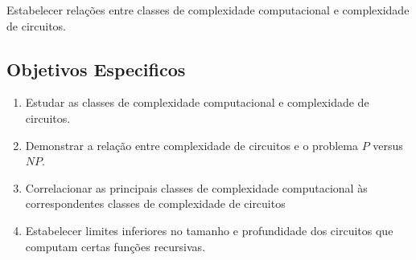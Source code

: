 Estabelecer relações entre classes de complexidade computacional
e complexidade de circuitos.

\subsection{Objetivos Especificos}

\begin{enumerate}
    \item Estudar as classes de complexidade computacional
        e complexidade de circuitos.
    \item Demonstrar a relação entre complexidade de circuitos
        e o problema $P$ versus $NP$.
    \item Correlacionar as principais classes
        de complexidade computacional
        às correspondentes classes de complexidade de circuitos
    \item Estabelecer limites inferiores no tamanho
        e profundidade dos circuitos
        que computam certas funções recursivas.
\end{enumerate}
